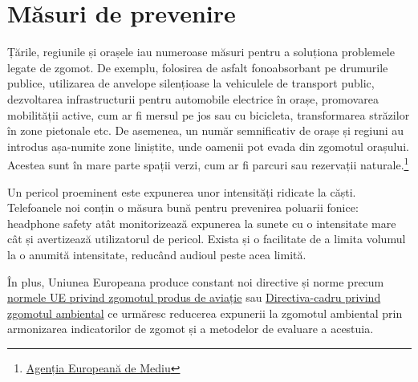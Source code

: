 \section{Măsuri de prevenire}

\quad Țările, regiunile și
 orașele iau numeroase măsuri pentru a soluționa problemele legate de zgomot. De exemplu, folosirea de asfalt fonoabsorbant pe drumurile publice, utilizarea de anvelope silențioase la vehiculele de transport public, dezvoltarea infrastructurii pentru automobile electrice în orașe, promovarea mobilității active, cum ar fi mersul pe jos sau cu bicicleta, transformarea străzilor în zone pietonale etc. De asemenea, un număr semnificativ de orașe și regiuni au introdus așa-numite zone liniștite, unde oamenii pot evada din zgomotul orașului. Acestea sunt în mare parte spații verzi, cum ar fi parcuri sau rezervații naturale.\footnote{\href{https://www.eea.europa.eu/ro/articles/poluarea-fonica-este-o-problema}{Agenția Europeană de Mediu}}

Un pericol proeminent este expunerea unor intensități ridicate la căști. Telefoanele noi conțin o măsura bună pentru prevenirea poluarii fonice: headphone safety atât monitorizează expunerea la sunete cu o intensitate mare cât și avertizează utilizatorul de pericol. Exista și o facilitate de a limita volumul la o anumită intensitate, reducând audioul peste acea limită.

În plus, Uniunea Europeana produce constant noi directive și norme precum \href{https://eur-lex.europa.eu/legal-content/RO/TXT/?uri=CELEX:32014R0598}{normele UE privind zgomotul produs de aviație} sau \href{https://eur-lex.europa.eu/legal-content/RO/ALL/?uri=CELEX:32002L0049}{Directiva-cadru privind zgomotul ambiental} ce urmăresc reducerea expunerii la zgomotul ambiental prin armonizarea indicatorilor de zgomot și a metodelor de evaluare a acestuia.


